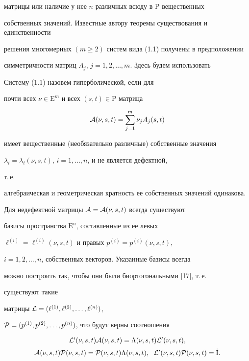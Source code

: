 матрицы или наличие у нее $n$ различных всюду в $\mathrm P$ вещественных 


собственных значений. Известные автору теоремы существования и единственности


решения многомерных $(m \geq 2)$ систем вида (1.1) получены в предположении 


симметричности матриц $A_j$, $j=1,2,\dotsc,m$. Здесь будем использовать 





\begin{defns}


Систему (1.1) назовем гиперболической, если для


почти всех $\nu \in {\mathrm E}^m$ и всех $(s,t) \in {\mathrm P}$ матрица


$$


{\cal A}(\nu,s,t)=\sum_{j=1}^{m} \nu_j A_{j}(s,t)


$$


имеет вещественные (необязательно различные) собственные значения 


$\lambda_i=\lambda_i (\nu,s,t)$, $i=1,\dotsc,n$, и не является дефектной,


т.\,е.


алгебраическая и геометрическая кратность ее собственных значений одинакова.


\end{defns}





Для недефектной матрицы ${\cal A}={\cal A}(\nu,s,t)$ всегда существуют 


базисы пространства ${\mathrm E}^n$, составленные из ее левых 


$\ell^{(i)}=\ell^{(i)}(\nu,s,t)$ и правых $p^{(i)}=p^{(i)}(\nu,s,t)$,


$i=1,2,\dotsc,n$, собственных векторов. Указанные базисы всегда 


можно построить так, чтобы они были биортогональными [17], т.\,е.


существуют такие


матрицы ${\cal L}=(\ell^{(1)},\ell^{(2)},\dotsc,\ell^{(n)})$,


${\cal P}=(p^{(1)},p^{(2)},\dotsc,p^{(n)})$, что будут верны соотношения


\begin{equation}


\begin{array}{c}


{\cal L}^{\prime}(\nu,s,t){\cal A}(\nu,s,t)=


\Lambda(\nu,s,t) {\cal L}^{\prime}(\nu,s,t),\\[2mm]


{\cal A}(\nu,s,t){\cal P}(\nu,s,t)=


{\cal P}(\nu,s,t) \Lambda (\nu,s,t),\ \;


{\cal L}^{\prime}(\nu,s,t){\cal P} (\nu,s,t)=\dot{\mathrm I}.


\end{array}


\end{equation}


